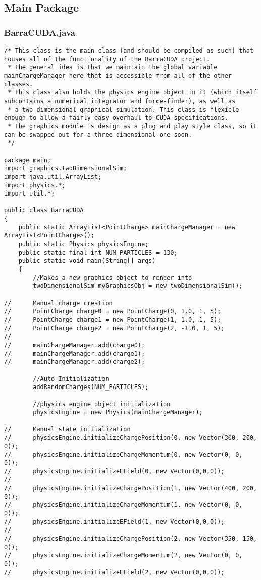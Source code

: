 \documentclass[10pt]{article}
\begin{document}
\subsection{Main Package}
\subsubsection{BarraCUDA.java}
\begin{verbatim}
/* This class is the main class (and should be compiled as such) that houses all of the functionality of the BarraCUDA project.
 * The general idea is that we maintain the global variable mainChargeManager here that is accessible from all of the other classes.
 * This class also holds the physics engine object in it (which itself subcontains a numerical integrator and force-finder), as well as 
 * a two-dimensional graphical simulation. This class is flexible enough to allow a fairly easy overhaul to CUDA specifications.
 * The graphics module is design as a plug and play style class, so it can be swapped out for a three-dimensional one soon.
 */

package main;
import graphics.twoDimensionalSim;
import java.util.ArrayList;
import physics.*;
import util.*;

public class BarraCUDA 
{
	public static ArrayList<PointCharge> mainChargeManager = new ArrayList<PointCharge>();
	public static Physics physicsEngine;
	public static final int NUM_PARTICLES = 130;
	public static void main(String[] args)
	{
		//Makes a new graphics object to render into
		twoDimensionalSim myGraphicsObj = new twoDimensionalSim();
		
//		Manual charge creation
//		PointCharge charge0 = new PointCharge(0, 1.0, 1, 5);
//		PointCharge charge1 = new PointCharge(1, 1.0, 1, 5);
//		PointCharge charge2 = new PointCharge(2, -1.0, 1, 5);
//		
//		mainChargeManager.add(charge0);
//		mainChargeManager.add(charge1);
//		mainChargeManager.add(charge2);

		//Auto Initialization
		addRandomCharges(NUM_PARTICLES);
		
		//physics engine object initialization
		physicsEngine = new Physics(mainChargeManager);

//		Manual state initialization
//		physicsEngine.initializeChargePosition(0, new Vector(300, 200, 0));
//		physicsEngine.initializeChargeMomentum(0, new Vector(0, 0, 0));
//		physicsEngine.initializeEField(0, new Vector(0,0,0));
//
//		physicsEngine.initializeChargePosition(1, new Vector(400, 200, 0));
//		physicsEngine.initializeChargeMomentum(1, new Vector(0, 0, 0));
//		physicsEngine.initializeEField(1, new Vector(0,0,0));
//
//		physicsEngine.initializeChargePosition(2, new Vector(350, 150, 0));
//		physicsEngine.initializeChargeMomentum(2, new Vector(0, 0, 0));
//		physicsEngine.initializeEField(2, new Vector(0,0,0));
		

\end{verbatim}
\end{document}
